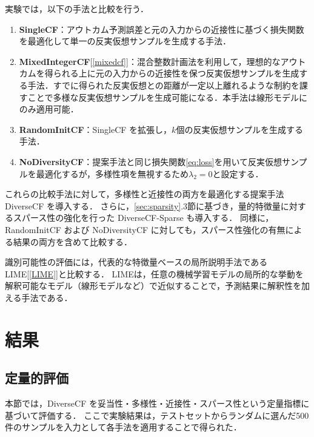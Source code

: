 \documentclass[dvipdfmx]{jreport}
\begin{document}
\newpage

実験では，以下の手法と比較を行う．
\begin{tcolorbox}[title=\textbf{比較手法}]
    \begin{enumerate}
        \item \textbf{SingleCF}：アウトカム予測誤差と元の入力からの近接性に基づく損失関数を最適化して単一の反実仮想サンプルを生成する手法．
        \item \textbf{MixedIntegerCF}[\ref{mixedcf}]：混合整数計画法を利用して，理想的なアウトカムを得られる上に元の入力からの近接性を保つ反実仮想サンプルを生成する手法．すでに得られた反実仮想との距離が一定以上離れるような制約を課すことで多様な反実仮想サンプルを生成可能になる．本手法は線形モデルにのみ適用可能．
        \item \textbf{RandomInitCF}：SingleCF を拡張し，$k$個の反実仮想サンプルを生成する手法．
        \item \textbf{NoDiversityCF}：提案手法と同じ損失関数\eqref{eq:loss}を用いて反実仮想サンプルを最適化するが，多様性項を無視するため$\lambda_2=0$と設定する．
    \end{enumerate}
\end{tcolorbox}

これらの比較手法に対して，多様性と近接性の両方を最適化する提案手法 DiverseCF を導入する．
さらに，\ref{sec:sparsity}.3節に基づき，量的特徴量に対するスパース性の強化を行った DiverseCF-Sparse も導入する．
同様に，RandomInitCF および NoDiversityCF に対しても，スパース性強化の有無による結果の両方を含めて比較する．

識別可能性の評価には，代表的な特徴量ベースの局所説明手法である LIME[\ref{LIME}]と比較する．
LIMEは，任意の機械学習モデルの局所的な挙動を解釈可能なモデル（線形モデルなど）で近似することで，予測結果に解釈性を加える手法である．

\section{結果}
\subsection{定量的評価}
本節では，DiverseCF を妥当性・多様性・近接性・スパース性という定量指標に基づいて評価する．
ここで実験結果は，テストセットからランダムに選んだ500件のサンプルを入力として各手法を適用することで得られた．
\end{document}
